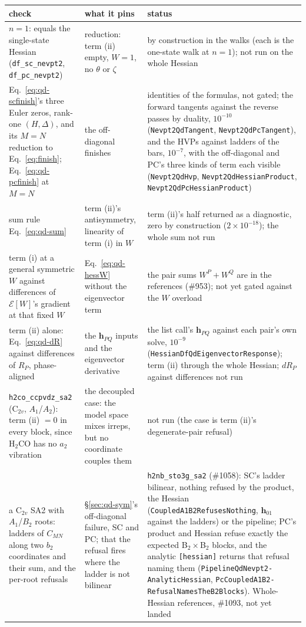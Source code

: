 \documentclass[11pt]{article}
\newcommand{\code}[1]{\texttt{#1}}
\begin{document}
\begin{table}[htbp]
\centering
\small
\begin{tabularx}{\linewidth}{@{}>{\raggedright\arraybackslash}p{}>{\raggedright\arraybackslash}p{}>{\raggedright\arraybackslash}X@{}}
\toprule
check & what it pins & status \\
\midrule
$n = 1$: equals the single-state Hessian (\code{df\_sc\_nevpt2}, \code{df\_pc\_nevpt2}) & reduction: term (ii) empty, $W = 1$, no $\theta$ or $\zeta$ & by construction in the walks (each is the one-state walk at $n = 1$); not run on the whole Hessian \\
Eq.~\eqref{eq:qd-scfinish}'s three Euler zeros, rank-one $(H,\Delta)$, and its $M = N$ reduction to Eq.~\eqref{eq:finish}; Eq.~\eqref{eq:qd-pcfinish} at $M = N$ & the off-diagonal finishes & identities of the formulas, not gated; the forward tangents against the reverse passes by duality, $10^{-10}$ (\code{Nevpt2QdTangent}, \code{Nevpt2QdPcTangent}), and the HVPs against ladders of the bars, $10^{-7}$, with the off-diagonal and PC's three kinds of term each visible (\code{Nevpt2QdHvp}, \code{Nevpt2QdHessianProduct}, \code{Nevpt2QdPcHessianProduct}) \\
sum rule Eq.~\eqref{eq:qd-sum} & term (ii)'s antisymmetry, linearity of term (i) in $W$ & term (ii)'s half returned as a diagnostic, zero by construction ($2\times10^{-18}$); the whole sum not run \\
term (i) at a general symmetric $W$ against differences of $\mathcal E[W]$'s gradient at that fixed $W$ & Eq.~\eqref{eq:qd-hessW} without the eigenvector term & the pair sums $W^P + W^Q$ are in the references (\#953); not yet gated against the $W$ overload \\
term (ii) alone: Eq.~\eqref{eq:qd-dR} against differences of $R_P$, phase-aligned & the $\mathbf h_{PQ}$ inputs and the eigenvector derivative & the list call's $\mathbf h_{PQ}$ against each pair's own solve, $10^{-9}$ (\code{HessianDfQdEigenvectorResponse}); term (ii) through the whole Hessian; $dR_P$ against differences not run \\
\code{h2co\_ccpvdz\_sa2} (C$_{2v}$, $A_1$/$A_2$): term (ii) $= 0$ in every block, since H$_2$CO has no $a_2$ vibration & the decoupled case: the model space mixes irreps, but no coordinate couples them & not run (the case is term (ii)'s degenerate-pair refusal) \\
a C$_{2v}$ SA2 with $A_1$/$B_2$ roots: ladders of $C_{MN}$ along two $b_2$ coordinates and their sum, and the per-root refusals & \S\ref{sec:qd-sym}'s off-diagonal failure, SC and PC; that the refusal fires where the ladder is not bilinear & \code{h2nb\_sto3g\_sa2} (\#1058): SC's ladder bilinear, nothing refused by the product, the Hessian (\code{CoupledA1B2RefusesNothing}, $\mathbf h_{01}$ against the ladders) or the pipeline; PC's product and Hessian refuse exactly the expected B$_2\times$B$_2$ blocks, and the analytic \code{[hessian]} returns that refusal naming them (\code{PipelineQdNevpt2-} \code{AnalyticHessian}, \code{PcCoupledA1B2-} \code{RefusalNamesTheB2Blocks}). Whole-Hessian references, \#1093, not yet landed \\

\end{tabularx}
\end{table}
\end{document}
